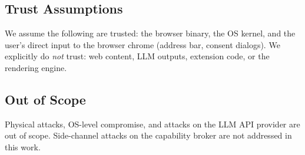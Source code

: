 \subsection{Trust Assumptions}

We assume the following are trusted:
the browser binary, the OS kernel, and the user's direct input
to the browser chrome (address bar, consent dialogs).
We explicitly do \emph{not} trust: web content, LLM outputs,
extension code, or the rendering engine.

\subsection{Out of Scope}

Physical attacks, OS-level compromise, and attacks on the LLM
API provider are out of scope.
Side-channel attacks on the capability broker are not addressed
in this work.

